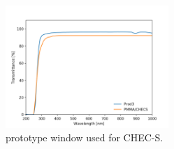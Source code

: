 \documentclass[GCT,short]{gct}
\begin{document}
\begin{figure}
\centering
\includegraphics[width=0.55\textwidth]{../41_cameraFilter/PrototypeWavelength.png} 
\caption{prototype window used for CHEC-S.}
\label{fig:window-proto}
\end{figure}

\begin{appendices}

\end{appendices}

\normalsize\small\footnotesize\scriptsize
{}



%		

\normalsize
\glsaddall
\printglossaries
{}
\end{document}
